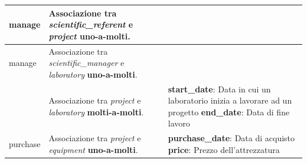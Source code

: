 \begin{tabular}{@{}| p{} | p{} | p{} |}
	\hline
	manage            & \begin{minipage}[t]{0.4\textwidth}
		                    \raggedright
		                    Associazione tra \textit{scientific\_referent} e \textit{project} \textbf{uno-a-molti}.
	                    \end{minipage}
	                  &                                                                                                       \\[15pt]
	\hline
	manage            & \begin{minipage}[t]{0.4\textwidth}
		                    \raggedright
		                    Associazione tra \textit{scientific\_manager} e \textit{laboratory} \textbf{uno-a-molti}.
	                    \end{minipage}
	                  &                                                                                                       \\[15pt]
	\hline
	\takepart         & \begin{minipage}[t]{0.4\textwidth}
		                    \raggedright
		                    Associazione tra \textit{project} e \textit{laboratory} \textbf{molti-a-molti}.
	                    \end{minipage}
	                  & \begin{minipage}[t]{0.3\textwidth}
		                    \raggedright
		                    \textbf{start\_date}: Data in cui un laboratorio inizia a lavorare ad un progetto \sskip
		                    \textbf{end\_date}: Data di fine lavoro
	                    \end{minipage}               \\[55pt]
	\hline
	purchase          & \begin{minipage}[t]{0.4\textwidth}
		                    \raggedright
		                    Associazione tra \textit{project} e \textit{equipment} \textbf{uno-a-molti}.
	                    \end{minipage}              & \begin{minipage}[t]{0.3\textwidth}
		                                                  \raggedright
		                                                  \textbf{purchase\_date}: Data di acquisto\sskip
		                                                  \textbf{price}: Prezzo dell'attrezzatura
	                                                  \end{minipage}                          \\[40pt]
	\hline

\end{tabular}
